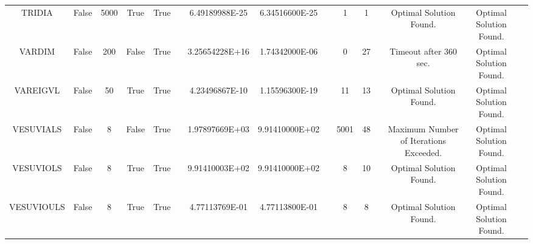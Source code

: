 \begin{longtable}{ccccccccccccccc}
	\cellcolor{default2} TRIDIA& \cellcolor{default2} False& \cellcolor{default2} 5000& \cellcolor{default2} True& \cellcolor{default2} True& \cellcolor{header} & \cellcolor{ok} 6.49189988E-25& \cellcolor{best} 6.34516600E-25& \cellcolor{header} & \cellcolor{best} 1& \cellcolor{best} 1& \cellcolor{header} & \cellcolor{default2} Optimal Solution Found.& \cellcolor{default2} Optimal Solution Found.& \cellcolor{header} \\
	\cellcolor{default1} VARDIM& \cellcolor{default1} False& \cellcolor{default1} 200& \cellcolor{default1} False& \cellcolor{default1} True& \cellcolor{header} & \cellcolor{poor} 3.25654228E+16& \cellcolor{best} 1.74342000E-06& \cellcolor{header} & \cellcolor{best} 0& \cellcolor{poor} 27& \cellcolor{header} & \cellcolor{default1} Timeout after 360 sec.& \cellcolor{default1} Optimal Solution Found.& \cellcolor{header} \\
	\cellcolor{default2} VAREIGVL& \cellcolor{default2} False& \cellcolor{default2} 50& \cellcolor{default2} True& \cellcolor{default2} True& \cellcolor{header} & \cellcolor{ok} 4.23496867E-10& \cellcolor{best} 1.15596300E-19& \cellcolor{header} & \cellcolor{best} 11& \cellcolor{ok} 13& \cellcolor{header} & \cellcolor{default2} Optimal Solution Found.& \cellcolor{default2} Optimal Solution Found.& \cellcolor{header} \\
	\cellcolor{default1} VESUVIALS& \cellcolor{default1} False& \cellcolor{default1} 8& \cellcolor{default1} False& \cellcolor{default1} True& \cellcolor{header} & \cellcolor{poor} 1.97897669E+03& \cellcolor{best} 9.91410000E+02& \cellcolor{header} & \cellcolor{poor} 5001& \cellcolor{best} 48& \cellcolor{header} & \cellcolor{default1} Maximum Number of Iterations Exceeded.& \cellcolor{default1} Optimal Solution Found.& \cellcolor{header} \\
	\cellcolor{default2} VESUVIOLS& \cellcolor{default2} False& \cellcolor{default2} 8& \cellcolor{default2} True& \cellcolor{default2} True& \cellcolor{header} & \cellcolor{ok} 9.91410003E+02& \cellcolor{best} 9.91410000E+02& \cellcolor{header} & \cellcolor{best} 8& \cellcolor{ok} 10& \cellcolor{header} & \cellcolor{default2} Optimal Solution Found.& \cellcolor{default2} Optimal Solution Found.& \cellcolor{header} \\
	\cellcolor{default1} VESUVIOULS& \cellcolor{default1} False& \cellcolor{default1} 8& \cellcolor{default1} True& \cellcolor{default1} True& \cellcolor{header} & \cellcolor{best} 4.77113769E-01& \cellcolor{ok} 4.77113800E-01& \cellcolor{header} & \cellcolor{best} 8& \cellcolor{best} 8& \cellcolor{header} & \cellcolor{default1} Optimal Solution Found.& \cellcolor{default1} Optimal Solution Found.& \cellcolor{header} \\

\end{longtable}
